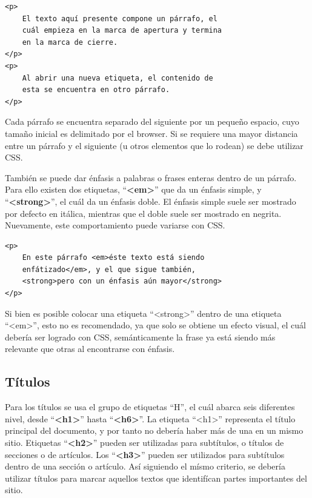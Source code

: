 \begin{lstlisting}[language=XHTML]
<p>
    El texto aquí presente compone un párrafo, el
    cuál empieza en la marca de apertura y termina
    en la marca de cierre.
</p>
<p>
    Al abrir una nueva etiqueta, el contenido de
    esta se encuentra en otro párrafo.
</p>
\end{lstlisting}

Cada párrafo se encuentra separado del siguiente por un pequeño espacio, cuyo
tamaño inicial es delimitado por el browser. Si se requiere una mayor distancia
entre un párrafo y el siguiente (u otros elementos que lo rodean) se debe utilizar
CSS.

También se puede dar énfasis a palabras o frases enteras dentro de un párrafo.
Para ello existen dos etiquetas, ``\textbf{<em>}'' que da un énfasis simple, y
``\textbf{<strong>}'', el cuál da un énfasis doble. El énfasis simple suele ser
mostrado por defecto en itálica, mientras que el doble suele ser mostrado en
negrita. Nuevamente, este comportamiento puede variarse con CSS.

\begin{lstlisting}[language=XHTML]
<p>
    En este párrafo <em>éste texto está siendo
    enfátizado</em>, y el que sigue también,
    <strong>pero con un énfasis aún mayor</strong>
</p>
\end{lstlisting}

Si bien es posible colocar una etiqueta ``<strong>'' dentro de una etiqueta
``<em>'', esto no es recomendado, ya que solo se obtiene un efecto visual, el
cuál debería ser logrado con CSS, semánticamente la frase ya está siendo más
relevante que otras al encontrarse con énfasis.

\subsection*{Títulos}

Para los títulos se usa el grupo de etiquetas ``H'', el cuál abarca seis diferentes
nivel, desde ``\textbf{<h1>}'' hasta ``\textbf{<h6>}''. La etiqueta ``<h1>''
representa el título principal del documento, y por tanto no debería haber más
de una en un mismo sitio. Etiquetas ``\textbf{<h2>}'' pueden ser utilizadas para
subtítulos, o títulos de secciones o de artículos. Los ``\textbf{<h3>}'' pueden
ser utilizados para subtítulos dentro de una sección o artículo. Así siguiendo el
mísmo criterio, se debería utilizar títulos para marcar aquellos textos que identifícan
partes importantes del sitio.

